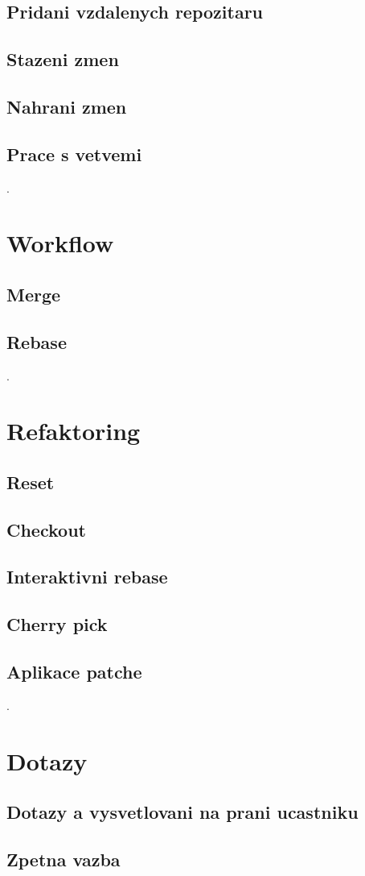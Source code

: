 \documentclass[11pt]{article}
\begin{document}
\subsection{Pridani vzdalenych repozitaru}
\subsection{Stazeni zmen}
\subsection{Nahrani zmen}
\subsection{Prace s vetvemi}

.

\section{Workflow}
\subsection{Merge}
\subsection{Rebase}

.

\section{Refaktoring}
\subsection{Reset}
\subsection{Checkout}
\subsection{Interaktivni rebase}
\subsection{Cherry pick}
\subsection{Aplikace patche}

.

\section{Dotazy}
\subsection{Dotazy a vysvetlovani na prani ucastniku}
\subsection{Zpetna vazba}
\end{document}

